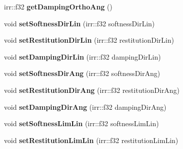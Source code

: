 \begin{DoxyCompactItemize}
\item 
\hypertarget{class_c_irr_b_p_slide_constraint_af31506ff537543dd817023f8f4599cc1}{
irr::f32 {\bfseries getDampingOrthoAng} ()}
\label{class_c_irr_b_p_slide_constraint_af31506ff537543dd817023f8f4599cc1}

\item 
\hypertarget{class_c_irr_b_p_slide_constraint_a397b97506df91156da00c37a26cc53c8}{
void {\bfseries setSoftnessDirLin} (irr::f32 softnessDirLin)}
\label{class_c_irr_b_p_slide_constraint_a397b97506df91156da00c37a26cc53c8}

\item 
\hypertarget{class_c_irr_b_p_slide_constraint_a32a9fcfd4ab74ffc80a06a36fe303678}{
void {\bfseries setRestitutionDirLin} (irr::f32 restitutionDirLin)}
\label{class_c_irr_b_p_slide_constraint_a32a9fcfd4ab74ffc80a06a36fe303678}

\item 
\hypertarget{class_c_irr_b_p_slide_constraint_a398722b0643a49337be23b5a2ca1aa89}{
void {\bfseries setDampingDirLin} (irr::f32 dampingDirLin)}
\label{class_c_irr_b_p_slide_constraint_a398722b0643a49337be23b5a2ca1aa89}

\item 
\hypertarget{class_c_irr_b_p_slide_constraint_a129735643ca5e0c355304b2ed967db74}{
void {\bfseries setSoftnessDirAng} (irr::f32 softnessDirAng)}
\label{class_c_irr_b_p_slide_constraint_a129735643ca5e0c355304b2ed967db74}

\item 
\hypertarget{class_c_irr_b_p_slide_constraint_aa427ff6f1bca3651a291e2564db83598}{
void {\bfseries setRestitutionDirAng} (irr::f32 restitutionDirAng)}
\label{class_c_irr_b_p_slide_constraint_aa427ff6f1bca3651a291e2564db83598}

\item 
\hypertarget{class_c_irr_b_p_slide_constraint_ab38bb01e738213517eed482668c66b19}{
void {\bfseries setDampingDirAng} (irr::f32 dampingDirAng)}
\label{class_c_irr_b_p_slide_constraint_ab38bb01e738213517eed482668c66b19}

\item 
\hypertarget{class_c_irr_b_p_slide_constraint_a220dbde37eeb940ec072b342a3605eb0}{
void {\bfseries setSoftnessLimLin} (irr::f32 softnessLimLin)}
\label{class_c_irr_b_p_slide_constraint_a220dbde37eeb940ec072b342a3605eb0}

\item 
\hypertarget{class_c_irr_b_p_slide_constraint_aa65843d056d31700196bc6da695b8f2c}{
void {\bfseries setRestitutionLimLin} (irr::f32 restitutionLimLin)}
\label{class_c_irr_b_p_slide_constraint_aa65843d056d31700196bc6da695b8f2c}


\end{DoxyCompactItemize}
